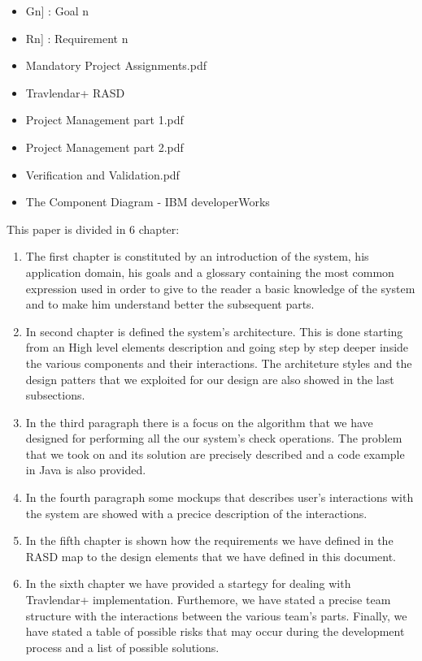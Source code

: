 \begin{itemize}
	\setlength{\leftskip}{0.5cm}
	\item \lbrack Gn] : Goal n
	\item \lbrack Rn] : Requirement n
\end{itemize}

\begin{itemize}
	\setlength{\leftskip}{0.5cm}
	\item Mandatory Project Assignments.pdf
	\item Travlendar+ RASD
	\item Project Management part 1.pdf
	\item Project Management part 2.pdf
	\item Verification and Validation.pdf
	\item The Component Diagram - IBM developerWorks
\end{itemize}

This paper is divided in 6 chapter:
\begin{enumerate}
	\setlength{\leftskip}{0.5cm}
	\item The first chapter is constituted by an introduction of the system, his application domain, his goals and a glossary containing the most common expression used in order to give to the reader a basic knowledge of the system and to make him understand better the subsequent parts.
	
	\item In second chapter is defined the system's architecture. This is done starting from an High level elements description and going step by step deeper inside the various components and their interactions. The architeture styles and the design patters that we exploited for our design are also showed in the last subsections.
	
	\item In the third paragraph there is a focus on the algorithm that we have designed for performing all the our system's check operations. The problem that we took on and its solution are precisely described and a code example in Java is also provided.
	
	\item In the fourth paragraph some mockups that describes user's interactions with the system are showed with a precice description of the interactions.
	
	\item In the fifth chapter is shown how the requirements we have defined in the RASD map to the design elements that we have defined in this document.
	
	\item In the sixth chapter we have provided a startegy for dealing with Travlendar+ implementation. Furthemore, we have stated a precise team structure with the interactions between the various team's parts. Finally, we have stated a table of possible risks that may occur during the development process and a list of possible solutions.
\end{enumerate}